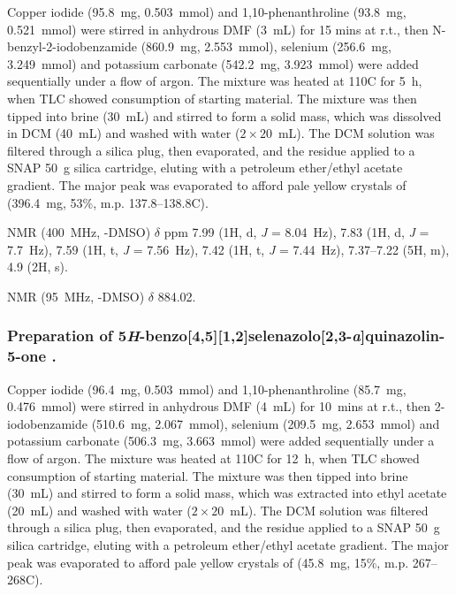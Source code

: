 \begin{refsection}
Copper iodide (95.8~mg, 0.503~mmol) and 1,10-phenanthroline (93.8~mg, 0.521~mmol) were stirred in anhydrous DMF (3~mL) for 15 mins at r.t., then N-benzyl-2-iodobenz\-amide (860.9~mg, 2.553~mmol), selenium (256.6~mg, 3.249~mmol) and potassium carbonate (542.2~mg, 3.923~mmol) were added sequentially under a flow of argon.
The mixture was heated at 110\degree{}C for 5~h, when TLC showed consumption of starting material.
The mixture was then tipped into brine (30~mL) and stirred to form a solid mass, which was dissolved in DCM (40~mL) and washed with water ($ 2 \times 20 $~mL).
The DCM solution was filtered through a silica plug, then evaporated, and the residue applied to a SNAP 50~g silica cartridge, eluting with a petroleum ether/ethyl acetate gradient.
The major peak was evaporated to afford pale yellow crystals of  (396.4~mg, 53\%, m.p. 137.8--138.8\degree{}C).

 NMR (400~MHz, -DMSO) $\delta$ ppm 7.99 (1H, d, \textit{J} = 8.04~Hz), 7.83 (1H, d, \textit{J} = 7.7~Hz), 7.59 (1H, t, \textit{J} = 7.56~Hz), 7.42 (1H, t, \textit{J} = 7.44~Hz), 7.37--7.22 (5H, m), 4.9 (2H, s).

 NMR (95~MHz, -DMSO) $ \delta $ 884.02.

\subsubsection[Preparation of \refcmpd{tetracycle}.]{Preparation of 5\textit{H}-benzo[4,5][1,2]selenazolo[2,3-\textit{a}]quinazolin-5-one .}

Copper iodide (96.4~mg, 0.503~mmol) and 1,10-phenanthroline (85.7~mg, 0.476~mmol) were stirred in anhydrous DMF (4~mL) for 10~mins at r.t., then 2-iodobenzamide (510.6~mg, 2.067~mmol), selenium (209.5~mg, 2.653~mmol) and potassium carbonate (506.3~mg, 3.663~mmol) were added sequentially under a flow of argon.
The mixture was heated at 110\degree{}C for 12~h, when TLC showed consumption of starting material.
The mixture was then tipped into brine (30~mL) and stirred to form a solid mass, which was extracted into ethyl acetate (20~mL) and washed with water ($ 2 \times 20 $~mL).
The DCM solution was filtered through a silica plug, then evaporated, and the residue applied to a SNAP 50~g silica cartridge, eluting with a petroleum ether/ethyl acetate gradient.
The major peak was evaporated to afford pale yellow crystals of  (45.8~mg, 15\%, m.p. 267--268\degree{}C). 


\end{refsection}

